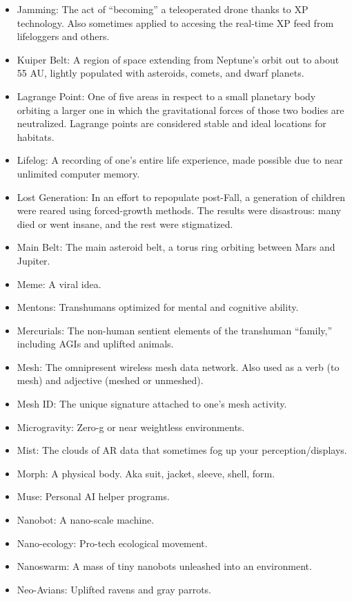 \begin{itemize}
\item Jamming: The act of ``becoming'' a teleoperated drone thanks to XP
  technology. Also sometimes applied to accesing the real-time XP feed
  from lifeloggers and others.
\item Kuiper Belt: A region of space extending from Neptune's orbit
  out to about 55 AU, lightly populated with asteroids, comets, and
  dwarf planets.
\item Lagrange Point: One of five areas in respect to a small
  planetary body orbiting a larger one in which the gravitational
  forces of those two bodies are neutralized.  Lagrange points are
  considered stable and ideal locations for habitats.
\item Lifelog: A recording of one's entire life experience, made
  possible due to near unlimited computer memory.
\item Lost Generation: In an effort to repopulate post-Fall, a
  generation of children were reared using forced-growth methods. The
  results were disastrous: many died or went insane, and the rest were
  stigmatized.
\item Main Belt: The main asteroid belt, a torus ring orbiting between
  Mars and Jupiter.
\item Meme: A viral idea.
\item Mentons: Transhumans optimized for mental and cognitive ability.
\item Mercurials: The non-human sentient elements of the transhuman
  ``family,'' including AGIs and uplifted animals.
\item Mesh: The omnipresent wireless mesh data network.  Also used as
  a verb (to mesh) and adjective (meshed or unmeshed).
\item Mesh ID: The unique signature attached to one's mesh activity.
\item Microgravity: Zero-g or near weightless environments.
\item Mist: The clouds of AR data that sometimes fog up your
  perception/displays.
\item Morph: A physical body. Aka suit, jacket, sleeve, shell, form.
\item Muse: Personal AI helper programs.
\item Nanobot: A nano-scale machine.
\item Nano-ecology: Pro-tech ecological movement.
\item Nanoswarm: A mass of tiny nanobots unleashed into an
  environment.
\item Neo-Avians: Uplifted ravens and gray parrots.

\end{itemize}
